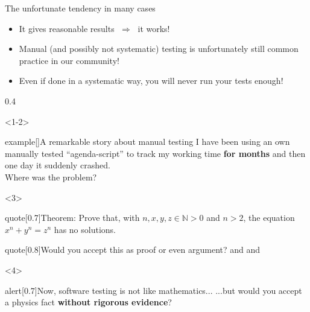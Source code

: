 \begin{frame}{The unfortunate tendency in many cases}
    \vspace{-1mm}
    \begin{itemize}
        \setlength{\fboxsep}{0pt}
        \item \alert{It gives reasonable results $\;\Rightarrow\;$ it works!} \,
        \item Manual (and possibly not systematic) testing is unfortunately still common practice in our community!
        \item Even if done in a systematic way, you will never run your tests enough!
    \end{itemize}
    \vspace{-1mm}
    \begin{overlayarea}{\textwidth}{0.4\textheight}
        \begin{onlyenv}<1-2>
            \vspace{3mm}
            \begin{varblock}{example}[\textwidth]{A remarkable story about manual testing}
                I have been using an own manually tested ``agenda-script'' to track my working time \alert{\textbf{for months}} and then one day it suddenly crashed.\\
                Where was the problem?
            \end{varblock}
        \end{onlyenv}
        \begin{onlyenv}<3>
            \begin{varblock}{quote}[0.7\textwidth]{Theorem:}
                Prove that, with $n,x,y,z\in \mathbb{N}>0$ and $n>2$, the equation $x^n+y^n =z^n$ has no solutions.
            \end{varblock}
            \begin{varblock}{quote}[0.8\textwidth]{Would you accept this as proof or even argument?}
                \small
                \; and\;\; and\;
            \end{varblock}
        \end{onlyenv}
        \begin{onlyenv}<4>
            \vspace{3mm}
            \begin{varblock}{alert}[0.7\textwidth]{Now, software testing is not like mathematics...}
                \large ...but would you accept a physics fact \textbf{without rigorous evidence}?
            \end{varblock}
        \end{onlyenv}
    \end{overlayarea}
\end{frame}
